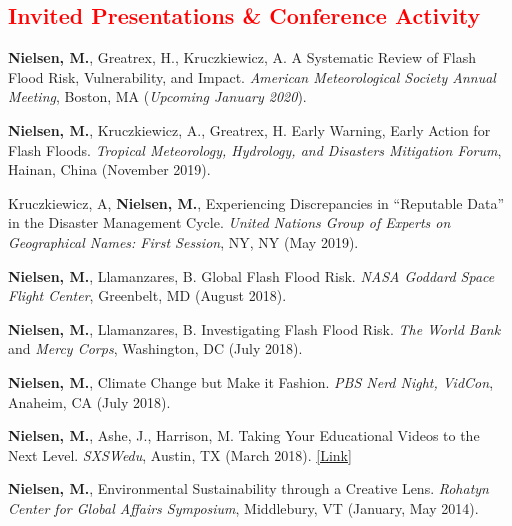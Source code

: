 \documentclass[margin, line]{res}
\begin{document}
\begin{resume}
\section{\sc \textcolor{Red}{\large{Invited Presentations \& Conference Activity}}}
\begin{etaremune}[leftmargin=.2in,topsep=0in,parsep=0in]
\item \textbf{Nielsen, M.}, Greatrex, H., Kruczkiewicz, A. A Systematic Review of Flash Flood Risk, Vulnerability, and Impact. \textit{American Meteorological Society Annual Meeting}, Boston, MA (\textit{Upcoming January 2020}).
\item \textbf{Nielsen, M.},  Kruczkiewicz, A., Greatrex, H. Early Warning, Early Action for Flash Floods. \textit{Tropical Meteorology, Hydrology, and Disasters Mitigation Forum}, Hainan, China (November 2019).
\item  Kruczkiewicz, A, \textbf{Nielsen, M.},  Experiencing Discrepancies in “Reputable Data” in the Disaster Management Cycle. \textit{United Nations Group of Experts on Geographical Names: First Session}, NY, NY (May 2019). 
\item  \textbf{Nielsen, M.}, Llamanzares, B. Global Flash Flood Risk. \textit{NASA Goddard Space Flight Center}, Greenbelt, MD (August 2018). 
\item  \textbf{Nielsen, M.}, Llamanzares, B. Investigating Flash Flood Risk. \textit{The World Bank} and \textit{Mercy Corps}, Washington, DC (July 2018). 
\item  \textbf{Nielsen, M.}, Climate Change but Make it Fashion. \textit{PBS Nerd Night, VidCon}, Anaheim, CA (July 2018).
\item  \textbf{Nielsen, M.}, Ashe, J., Harrison, M. Taking Your Educational Videos to the Next Level. \textit{SXSWedu}, Austin, TX (March 2018). \href{https://schedule.sxswedu.com/2018/events/PP76461}{[Link]}
\item  \textbf{Nielsen, M.}, Environmental Sustainability through a Creative Lens. \textit{Rohatyn Center for Global Affairs Symposium}, Middlebury, VT (January, May 2014). 
\end{etaremune}



\fancyhf{}



\end{resume}
\end{document}
